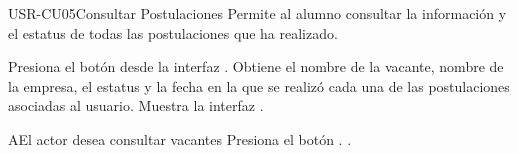 \begin{UseCase}[]{USR-CU05}{Consultar Postulaciones}{
	Permite al alumno consultar la información y el estatus de todas las postulaciones que ha realizado.
}
\end{UseCase}

\begin{UCtrayectoria}
	\UCpaso [\UCactor] Presiona el botón  desde la interfaz .
    \UCpaso [\UCsist] Obtiene el nombre de la vacante, nombre de la empresa, el estatus  y la fecha en la que se realizó cada una de las postulaciones asociadas al usuario.
	\UCpaso [\UCsist] Muestra la interfaz .
\end{UCtrayectoria}

\begin{UCtrayectoriaA}{A}{El actor desea consultar vacantes}
	\UCpaso [\UCsist] Presiona el botón .
	.
\end{UCtrayectoriaA} 